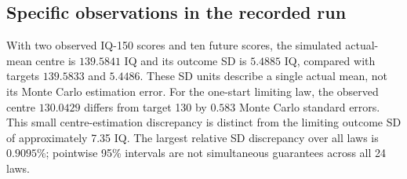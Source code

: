 \subsection{Specific observations in the recorded run}
With two observed IQ-150 scores and ten future scores, the simulated actual-mean centre is $139.5841$ IQ and its outcome SD is $5.4885$ IQ, compared with targets $139.5833$ and $5.4486$. These SD units describe a single actual mean, not its Monte Carlo estimation error. For the one-start limiting law, the observed centre $130.0429$ differs from target 130 by $0.583$ Monte Carlo standard errors. This small centre-estimation discrepancy is distinct from the limiting outcome SD of approximately 7.35 IQ. The largest relative SD discrepancy over all laws is $0.9095$\%; pointwise 95\% intervals are not simultaneous guarantees across all 24 laws.
